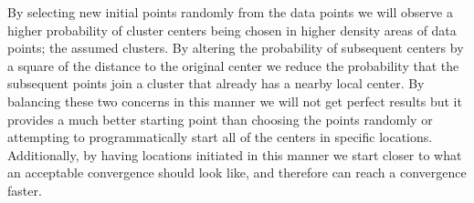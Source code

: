 \documentclass[]{article}
\begin{document}
\vspace{2em}

By selecting new initial points randomly from the data points we will observe a higher probability of cluster centers being chosen in higher density areas of data points; the assumed clusters. 
By altering the probability of subsequent centers by a square of the distance to the original center we reduce the probability that the subsequent points join a cluster that already has a nearby local center.
By balancing these two concerns in this manner we will not get perfect results but it provides a much better starting point than choosing the points randomly or attempting to programmatically start all of the centers in specific locations.
Additionally, by having locations initiated in this manner we start closer to what an acceptable convergence should look like, and therefore can reach a convergence faster.
\end{document}
